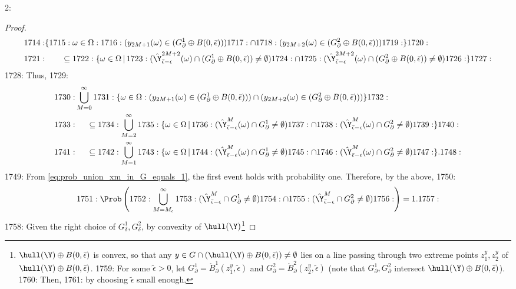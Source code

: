 2: \documentclass[12pt]{l4dc2022} %
\begin{document}
\begin{proof}
\begin{align*}
1714: &\{
1715: \omega\in\Omega: 
1716: (y_{2M+1}(\omega)\in (G_\partial^1\oplus B(0,\bar{\epsilon})))
1717: \cap 
1718: (y_{2M+2}(\omega)\in (G_\partial^2\oplus B(0,\bar{\epsilon})))
1719: \}
1720: \\
1721: &\qquad\subseteq
1722: \{\omega\in\Omega \,|\, 
1723: (\hat\Y^{2M+2}_{\bar{\epsilon}-\epsilon}(\omega)\cap (G_\partial^1\oplus B(0,\bar{\epsilon}))\neq\emptyset)
1724: \cap
1725: (\hat\Y^{2M+2}_{\bar{\epsilon}-\epsilon}(\omega)\cap (G_\partial^2\oplus B(0,\bar{\epsilon}))\neq\emptyset)
1726: \} 
1727: \end{align*}
1728: Thus, 
1729: \begin{align*}
1730: &\bigcup_{M=0}^\infty
1731: \{\omega\in\Omega: (y_{2M+1}(\omega)\in (G_\partial^1\oplus B(0,\bar{\epsilon})))\cap (y_{2M+2}(\omega)\in (G_\partial^2\oplus B(0,\bar{\epsilon})))\}
1732: \\
1733: &\hspace{5mm}\subseteq
1734: \bigcup_{M=2}^\infty
1735: \{\omega\in\Omega \,|\,  
1736: (\hat\Y^M_{\bar{\epsilon}-\epsilon}(\omega)\cap G_\partial^1\neq\emptyset)
1737: \cap
1738: (\hat\Y^M_{\bar{\epsilon}-\epsilon}(\omega)\cap G_\partial^2\neq\emptyset)
1739: \} 
1740: \\
1741: &\hspace{5mm}\subseteq
1742: \bigcup_{M=1}^\infty
1743: \{\omega\in\Omega \,|\, 
1744: (\hat\Y^M_{\bar{\epsilon}-\epsilon}(\omega)\cap G_\partial^1\neq\emptyset)
1745: \cap
1746: (\hat\Y^M_{\bar{\epsilon}-\epsilon}(\omega)\cap G_\partial^2\neq\emptyset)
1747: \}.
1748: \end{align*}
1749: From \eqref{eq:prob_union_xm_in_G_equals_1}, the first event holds with probability one. Therefore, by the above, 
1750: $$
1751: \Prob\left(
1752: \bigcup_{M=M_\epsilon}^\infty
1753: (\hat\Y^M_{\bar{\epsilon}-\epsilon}\cap G_\partial^1\neq\emptyset)
1754: \cap
1755: (\hat\Y^M_{\bar{\epsilon}-\epsilon}\cap G_\partial^2\neq\emptyset)
1756: \right)=1.
1757: $$
1758: Given the right choice of $G_\delta^1,G_\delta^2$, by convexity of $\hull(\Y)$\footnote{$\hull(\Y)\oplus B(0,\bar\epsilon)$ is convex, so that any $y\in G\cap (\hull(\Y)\oplus B(0,\bar\epsilon))\neq\emptyset$ lies on a line passing through two extreme points $z_1^y,z_2^y$ of $\hull(\Y)\oplus B(0,\bar\epsilon)$.  
1759: For some $\tilde\epsilon>0$, let $G_\partial^1=\mathring{B}_\partial^1(z_1^y,\tilde\epsilon)$ and $G_\partial^2=\mathring{B}_\partial^2(z_2^y,\tilde\epsilon)$ (note that $G_\partial^1,G_\partial^2$ intersect $\hull(\Y)\oplus B(0,\bar\epsilon)$). 
1760: Then,  
1761: by choosing $\tilde\epsilon$ small enough, 
}
\end{proof}
\end{document}
